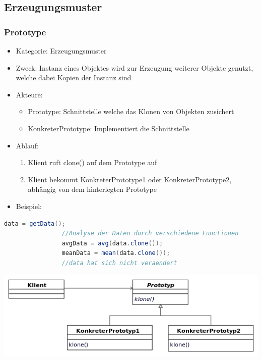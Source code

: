 \documentclass[11pt, fleqn, a4paper, leqno]{scrartcl} %
\begin{document}
		\subsection{Erzeugungsmuster}
		\subsubsection{Prototype}
			\begin{itemize}
				\item Kategorie: Erzeugungsmuster
				\item Zweck: Instanz eines Objektes wird zur Erzeugung weiterer Objekte genutzt, welche dabei Kopien der Instanz sind
				\item Akteure: 
					\begin{itemize}
						\item Prototype: Schnittstelle welche das Klonen von Objekten zusichert
						\item KonkreterPrototype: Implementiert die Schnittstelle
					\end{itemize}
				\item Ablauf:
					\begin{enumerate}
						\item Klient ruft clone() auf dem Prototype auf
						\item Klient bekommt KonkreterPrototype1 oder KonkreterPrototype2, abhängig von dem hinterlegten Prototype
					\end{enumerate}
				\item Beispiel: 
			\end{itemize}
			\begin{lstlisting}[frame=single,language=Java]
				data = getData();
				//Analyse der Daten durch verschiedene Functionen
				avgData = avg(data.clone());
				meanData = mean(data.clone());
				//data hat sich nicht veraendert
			\end{lstlisting}
			\includegraphics[scale=0.6]{images/prototype.png}
		\newpage		
\end{document}
